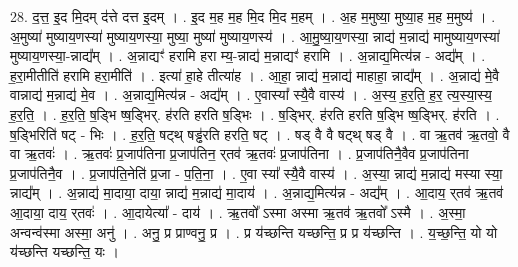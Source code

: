 \documentclass[17pt]{extarticle}
\begin{document}
28. द॒त्त॒ इ॒द मि॒दम् द॑त्ते दत्त इ॒दम् । . इ॒द म॒ह म॒ह मि॒द मि॒द म॒हम् । . अ॒ह म॒मुष्या॒ मुष्या॒ह म॒ह म॒मुष्य॑ । . अ॒मुष्या॑ मुष्याय॒णस्या॑ मुष्याय॒णस्या॒ मुष्या॒ मुष्या॑ मुष्याय॒णस्य॑ । . आ॒मु॒ष्या॒य॒णस्या॒ न्नाद्य॑ म॒न्नाद्य॑ मामुष्याय॒णस्या॑ मुष्याय॒णस्या॒-न्नाद्य᳚म् । . अ॒न्नाद्यꣳ॑ हरामि हरा म्य॒-न्नाद्य॑ म॒न्नाद्यꣳ॑ हरामि । . अ॒न्नाद्य॒मित्य॑न्न - अद्य᳚म् । . ह॒रा॒मीतीति॑ हरामि हरा॒मीति॑ । . इत्या॑ हा॒हे तीत्या॑ह । . आ॒हा॒ न्नाद्य॑ म॒न्नाद्य॑ माहाहा॒ न्नाद्य᳚म् । . अ॒न्नाद्य॑ मे॒वै वान्नाद्य॑ म॒न्नाद्य॑ मे॒व । . अ॒न्नाद्य॒मित्य॑न्न - अद्य᳚म् । . ए॒वास्या᳚ स्यै॒वै वास्य॑ । . अ॒स्य॒ ह॒र॒ति॒ ह॒र॒ त्य॒स्या॒स्य॒ ह॒र॒ति॒ । . ह॒र॒ति॒ ष॒ड्भि ष्ष॒ड्भिर्. ह॑रति हरति ष॒ड्भिः । . ष॒ड्भिर्. ह॑रति हरति ष॒ड्भि ष्ष॒ड्भिर्. ह॑रति । . ष॒ड्भिरिति॑ षट् - भिः । . ह॒र॒ति॒ षट्थ् षड्ढ॑रति हरति॒ षट् । . षड् वै वै षट्थ् षड् वै । . वा ऋ॒तव॑ ऋ॒तवो॒ वै वा ऋ॒तवः॑ । . ऋ॒तवः॑ प्र॒जाप॑तिना प्र॒जाप॑तिन॒ र्‌तव॑ ऋ॒तवः॑ प्र॒जाप॑तिना । . प्र॒जाप॑तिनै॒वैव प्र॒जाप॑तिना प्र॒जाप॑तिनै॒व । . प्र॒जाप॑ति॒नेति॑ प्र॒जा - प॒ति॒ना॒ । . ए॒वा स्या᳚ स्यै॒वै वास्य॑ । . अ॒स्या॒ न्नाद्य॑ म॒न्नाद्य॑ मस्या स्या॒ न्नाद्य᳚म् । . अ॒न्नाद्य॑ मा॒दाया॒ दाया॒ न्नाद्य॑ म॒न्नाद्य॑ मा॒दाय॑ । . अ॒न्नाद्य॒मित्य॑न्न - अद्य᳚म् । . आ॒दाय॒ र्‌तव॑ ऋ॒तव॑ आ॒दाया॒ दाय॒ र्‌तवः॑ । . आ॒दायेत्या᳚ - दाय॑ । . ऋ॒तवो᳚ ऽस्मा अस्मा ऋ॒तव॑ ऋ॒तवो᳚ ऽस्मै । . अ॒स्मा॒ अन्वन्व॑स्मा अस्मा॒ अनु॑ । . अनु॒ प्र प्राण्वनु॒ प्र । . प्र य॑च्छन्ति यच्छन्ति॒ प्र प्र य॑च्छन्ति । . य॒च्छ॒न्ति॒ यो यो य॑च्छन्ति यच्छन्ति॒ यः । \newline
\end{document}

